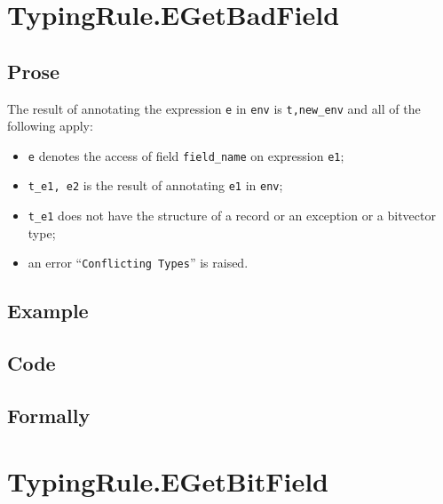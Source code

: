 \documentclass{book}
\begin{document}
\section{TypingRule.EGetBadField \label{sec:TypingRule.EGetBadField}}

 \subsection{Prose}
  The result of annotating the expression \texttt{e} in \texttt{env} is
\texttt{t,new\_env} and all of the following apply:
   \begin{itemize}
   \item \texttt{e} denotes the access of field \texttt{field\_name} on expression \texttt{e1};
   \item \texttt{t\_e1, e2} is the result of annotating \texttt{e1} in \texttt{env};
   \item \texttt{t\_e1} does not have the structure of a record or an exception or a bitvector type;
   \item an error ``\texttt{Conflicting Types}'' is raised.
   \end{itemize}

 \subsection{Example}

 \subsection{Code}

\begin{emptyformal}
    \subsection{Formally}
\end{emptyformal}


\section{TypingRule.EGetBitField \label{sec:TypingRule.EGetBitField}}
\end{document}
